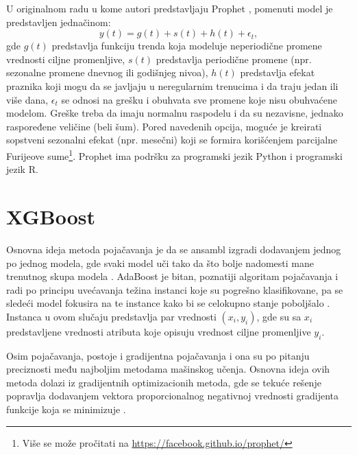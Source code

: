 \documentclass[12pt,oneside]{memoir}
\begin{document}
U originalnom radu u kome autori predstavljaju Prophet \cite{taylor2018forecasting}, pomenuti model je predstavljen jednačinom:
\begin{equation*}
\label{eq: prophet}
y(t) = g(t) + s(t) + h(t) + \epsilon_t,
\end{equation*}
gde $g(t)$ predstavlja funkciju trenda koja modeluje neperiodične promene vrednosti ciljne promenljive, $s(t)$ predstavlja periodične promene (npr. sezonalne promene dnevnog ili godišnjeg nivoa), $h(t)$ predstavlja efekat praznika koji mogu da se javljaju u neregularnim trenucima i da traju jedan ili više dana, $\epsilon_t$ se odnosi na grešku i obuhvata sve promene koje nisu obuhvaćene modelom. Greške treba da imaju normalnu raspodelu i da su nezavisne, jednako raspoređene veličine (beli šum). Pored navedenih opcija, moguće je kreirati sopstveni sezonalni efekat (npr. mesečni) koji se formira korišćenjem parcijalne Furijeove sume\footnote{Više se može pročitati na \url{https://facebook.github.io/prophet/}}. Prophet ima podršku za programski jezik Python i programski jezik R.

\section{XGBoost}
Osnovna ideja metoda pojačavanja je da se ansambl izgradi dodavanjem jednog po jednog modela, gde svaki model uči tako da što bolje nadomesti mane trenutnog skupa modela \cite{ml}. AdaBoost je bitan, poznatiji algoritam pojačavanja i radi po principu uvećavanja težina instanci koje su pogrešno klasifikovane, pa se sledeći model fokusira na te instance kako bi se celokupno stanje poboljšalo \cite{mayr2014evolution}. Instanca u ovom slučaju predstavlja par vrednosti $(x_i, y_i)$, gde su sa $x_i$ predstavljene vrednosti atributa koje opisuju vrednost ciljne promenljive $y_i$.

Osim pojačavanja, postoje i gradijentna pojačavanja i ona su po pitanju preciznosti među najboljim metodama mašinskog učenja. Osnovna ideja ovih metoda dolazi iz gradijentnih optimizacionih metoda, gde se tekuće rešenje popravlja dodavanjem vektora proporcionalnog negativnoj vrednosti gradijenta funkcije koja se minimizuje \cite{ml}. 
\end{document}
